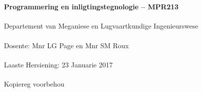 \begin{titlepage}
    \thispagestyle{empty}
    \\~\\[18cm]
    \large
    \textbf{Programmering en inligtingstegnologie -- MPR213} \\~\\
    Departement van Meganiese en Lugvaartkundige Ingenieurswese \\~\\[0.5cm]
    \normalsize
    Dosente: Mnr LG Page en  Mnr SM Roux \\~\\
    Laaste Hersiening: 23 Januarie 2017 \\~\\[0.5em]
    \textcopyright \quad Kopiereg voorbehou \\~\\
\end{titlepage}
\restoregeometry
